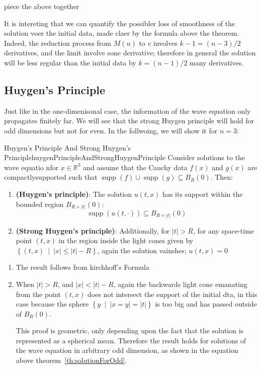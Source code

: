 \documentclass{book}
\newenvironment{Proof}[1][]
  {\begin{ProofTcb}[#1]}
  {\end{ProofTcb}}
\newcommand{\R}{{\mathbb{R}}}
\newcommand{\sse}{\subseteq}
\renewcommand{\bf}[1]{\textbf{#1}}
\newcommand{\supp}{\operatorname{supp}}
\newcommand{\set}[2]{\left\{#1 \ \middle|\ #2\right\}}
\begin{document}
\begin{Proof}
	piece the above together
\end{Proof}

It is intereting that we can quantify the possibler loss of smoothness of the solution voer the initial data, made claer
by the formula above the theorem. Indeed, the reduction process from $M(u)$ to $v$ involves $k-1 = (n-3)/2$ derivatives,
and the limit involve sone derivative; therefore in general the solution will be less regular than the initial data by
$k = (n-1)/2$ many derivatives.


\subsection{Huygen's Principle}

Just like in the one-dimenisonal case, the information of the wave equation only propagates finitely far. We will see
that the strong Huygen principle will hold for odd dimensions but not for even. In the follwoing, we will show it for $n
=3$:

\begin{thm}{Huygen's Principle And Strong Huygen's Principle}{huygenPrincipleAndStrongHuygenPrinciple}
	Consider solutions to the wave equatio nfor $x \in \R^3$ and assume that the Cauchy data $f(x)$ and $g(x)$ are
	compactlysupported such that $\supp(f) \cup \supp(g) \sse B_R(0)$. Then:
	\begin{enumerate}
		\item \bf{(Huygen's principle)}: The solution $u(t,x)$ has its support within the bounded region $B_{R + |t|}(0)$:
			\[
				\supp(u(t,\cdot)) \sse B_{R + |t|}(0)
			\]
		\item \bf{(Strong Huygen's principle)}: Additionally, for $|t| > R$, for any space-time point $(t,x)$ in the region
			inside the light cones given by $\set{(t,x)}{ |x| \le |t| - R}$, again the solution vainshes; $u(t,x) = 0$
	\end{enumerate}
\end{thm}

\begin{Proof}
	\begin{enumerate}
		\item The result follows from kirchhoff's Formula
		\item When $|t| > R$, and $|x| < |t| - R$, again the backwards light cone emanating from the point $(t,x)$ does
			not intersect the support of the initial dta, in this case because the sphere $\set{y}{ |x=y| = |t|}$ is too
			big and has passed outside of $B_R(0)$.

			This proof is geometric, only depending upon the fact that the solution is represented as a spherical mean.
			Therefore the result holds for solutions of the wave equation in arbitrary odd dimension, as shown in the
			equation above theorem~\ref{th:solutionForOdd}.
	\end{enumerate}
\end{Proof}
\end{document}

